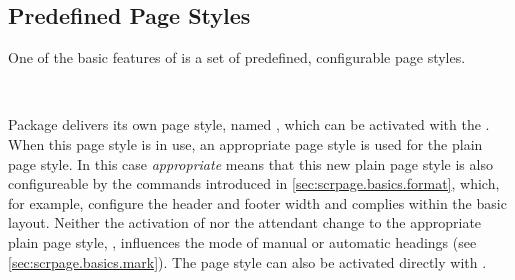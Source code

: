   
\subsection{Predefined Page Styles}\label{sec:scrpage.basics.buildIn}

One of the basic features of  is a set of predefined,
configurable page styles.


\begin{Declaration}
  \\
\end{Declaration}%
%
%
%
%
Package  delivers its own page style, named
, which can be activated with the
. When this page style is in use, an
appropriate  page style is used for the plain page style.
In this case \emph{appropriate} means that this new plain page style is also
configureable by the commands introduced in
\autoref{sec:scrpage.basics.format}, which, for example, configure the header
and footer width and complies within the basic layout. Neither the activation
of  nor the attendant change to the appropriate plain
page style, , influences the mode of manual or automatic
headings (see
\autoref{sec:scrpage.basics.mark}). The  page style can
also be activated directly with .

